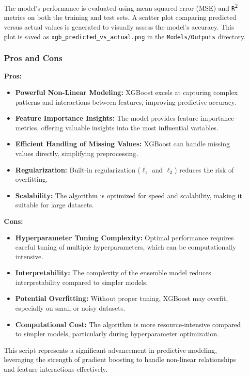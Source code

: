 The model's performance is evaluated using mean squared error (MSE) and \texttt{R\textsuperscript{2}} metrics on both the training and test sets. A scatter plot comparing predicted versus actual values is generated to visually assess the model’s accuracy. This plot is saved as \texttt{xgb\_predicted\_vs\_actual.png} in the \texttt{Models/Outputs} directory.

\subsubsection*{Pros and Cons}

\textbf{Pros:}
\begin{itemize}
    \item \textbf{Powerful Non-Linear Modeling:} XGBoost excels at capturing complex patterns and interactions between features, improving predictive accuracy.
    \item \textbf{Feature Importance Insights:} The model provides feature importance metrics, offering valuable insights into the most influential variables.
    \item \textbf{Efficient Handling of Missing Values:} XGBoost can handle missing values directly, simplifying preprocessing.
    \item \textbf{Regularization:} Built-in regularization (\(\ell_1\) and \(\ell_2\)) reduces the risk of overfitting.
    \item \textbf{Scalability:} The algorithm is optimized for speed and scalability, making it suitable for large datasets.
\end{itemize}

\textbf{Cons:}
\begin{itemize}
    \item \textbf{Hyperparameter Tuning Complexity:} Optimal performance requires careful tuning of multiple hyperparameters, which can be computationally intensive.
    \item \textbf{Interpretability:} The complexity of the ensemble model reduces interpretability compared to simpler models.
    \item \textbf{Potential Overfitting:} Without proper tuning, XGBoost may overfit, especially on small or noisy datasets.
    \item \textbf{Computational Cost:} The algorithm is more resource-intensive compared to simpler models, particularly during hyperparameter optimization.
\end{itemize}

This script represents a significant advancement in predictive modeling, leveraging the strength of gradient boosting to handle non-linear relationships and feature interactions effectively. \\

